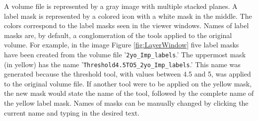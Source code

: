\documentclass[fleqn,11pt,openany]{book}
\begin{document}
A volume file is represented by a gray image with multiple stacked planes.  
A label mask is represented by a colored icon with a white mask in the middle.  
The colors correspond to the label masks seen in the viewer windows.
Names of label masks are, by default, a conglomeration of the tools applied to the original volume.
For example, in the image Figure \ref{fig:LayerWindow} five label masks have been created from the volume file '\verb|2yo_Imp_labels|.' 
The uppermost mask (in yellow) has the name '\verb|Threshold4.5TO5_2yo_Imp_labels|.' 
This name was generated because the threshold tool, with values between 4.5 and 5, was applied to the original volume file. 
If another tool were to be applied on the yellow mask, the new mask would state the name of the tool, followed by the complete name of the yellow label mask.  
Names of masks can be manually changed by clicking the current name and typing in the desired text.
\end{document}
